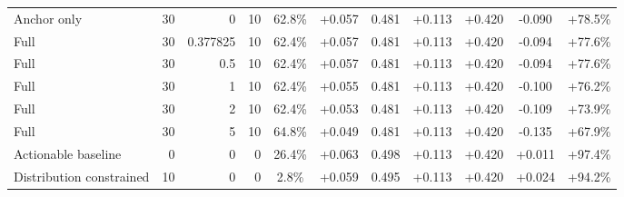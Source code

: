 \begin{table}[htbp]
\begin{tabular}{lrrrccccccc}
Anchor only & 30 & 0 & 10 & 62.8\% & +0.057 & 0.481 & +0.113 & +0.420 & -0.090 & +78.5\% \\
Full & 30 & 0.377825 & 10 & 62.4\% & +0.057 & 0.481 & +0.113 & +0.420 & -0.094 & +77.6\% \\
Full & 30 & 0.5 & 10 & 62.4\% & +0.057 & 0.481 & +0.113 & +0.420 & -0.094 & +77.6\% \\
Full & 30 & 1 & 10 & 62.4\% & +0.055 & 0.481 & +0.113 & +0.420 & -0.100 & +76.2\% \\
Full & 30 & 2 & 10 & 62.4\% & +0.053 & 0.481 & +0.113 & +0.420 & -0.109 & +73.9\% \\
Full & 30 & 5 & 10 & 64.8\% & +0.049 & 0.481 & +0.113 & +0.420 & -0.135 & +67.9\% \\
Actionable baseline & 0 & 0 & 0 & 26.4\% & +0.063 & 0.498 & +0.113 & +0.420 & +0.011 & +97.4\% \\
Distribution constrained & 10 & 0 & 0 & 2.8\% & +0.059 & 0.495 & +0.113 & +0.420 & +0.024 & +94.2\% \\
\bottomrule
\end{tabular}
\end{table}